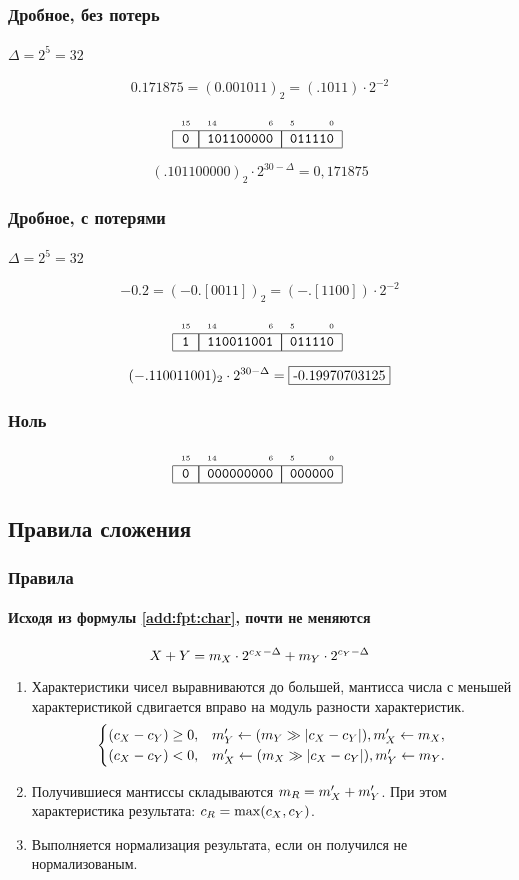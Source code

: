 \begin{frame}
    \frametitle{Дробное, без потерь}
    \framesubtitle{$\Delta=2^5=32$}
    \[
        0.171875=(0.001011)_2=(.1011)\cdot 2^{-2}
    \]
    
    \[
        \FloatMyCharHex{0}{101100000}{011110}
    \]
    
    \[
        (.101100000)_2\cdot 2^{30-\Delta}=0,171875
    \]
\end{frame}

\begin{frame}
    \frametitle{Дробное, с потерями}
    \framesubtitle{$\Delta=2^5=32$}
    \[
        -0.2=(-0.[0011])_2=(-.[1100])\cdot 2^{-2}
    \]
    
    \[
        \FloatMyCharHex{1}{110011001}{011110}
    \]
    
    \[
        (-.110011001)_2\cdot 2^{30-\Delta}=\fbox{-0.19970703125}
    \]
\end{frame}

\begin{frame}
    \frametitle{Ноль}
    
    \[
        \FloatMyCharHex{0}{000000000}{000000}
    \]
\end{frame}


\subsection{Правила сложения}


\begin{frame}
    \frametitle{Правила}
    \framesubtitle{Исходя из формулы \eqref{add:fpt:char}, почти не меняются}

    \[
        X+Y=
            m_{X}\cdot 2^{c_{X}-\Delta}+
            m_{Y}\cdot 2^{c_{Y}-\Delta}
    \]
        
    \begin{enumerate}
        \item Характеристики чисел выравниваются до большей, мантисса числа с меньшей характеристикой сдвигается вправо на модуль разности характеристик.
        \[
            \begin{cases}
                (c_{X}-c_{Y}) \ge 0, & m_{Y}'\gets(m_{Y}\gg |c_{X}-c_{Y}|), m_{X}'\gets m_{X},\\
                (c_{X}-c_{Y}) < 0,   & m_{X}'\gets(m_{X}\gg |c_{X}-c_{Y}|), m_{Y}'\gets m_{Y}.
            \end{cases}
        \]
        
        \item Получившиеся мантиссы складываются $m_{R}=m_{X}'+m_{Y}'$. При этом характеристика результата: $c_{R}=\max(c_{X}, c_{Y})$.
        
        \item Выполняется нормализация результата, если он получился не нормализованым.
    \end{enumerate}
\end{frame}



